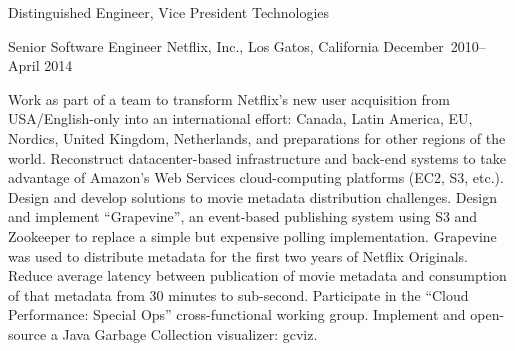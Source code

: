 \documentclass{resume}
\begin{document}
\begin{resume}
\begin{Employment}
\begin{job}{Distinguished Engineer, Vice President Technologies}
\end{job}
\begin{job}{Senior Software Engineer}
           {Netflix, Inc., Los Gatos, California}
           {December~2010--April 2014}

Work as part of a team to transform Netflix's new user acquisition
from USA/English-only into an international effort: Canada, Latin
America, EU, Nordics, United Kingdom, Netherlands, and preparations
for other regions of the world. Reconstruct datacenter-based
infrastructure and back-end systems to take advantage of Amazon's Web
Services cloud-computing platforms (EC2, S3, etc.).  Design and
develop solutions to movie metadata distribution challenges.  Design
and implement ``Grapevine'', an event-based publishing system using S3
and Zookeeper to replace a simple but expensive polling
implementation. Grapevine was used to distribute metadata for the
first two years of Netflix Originals. Reduce average latency between
publication of movie metadata and consumption of that metadata from 30
minutes to sub-second.  Participate in the ``Cloud Performance:
Special Ops'' cross-functional working group. Implement and
open-source a Java Garbage Collection visualizer: gcviz.


\end{job}
\end{Employment}
\end{resume}
\end{document}

